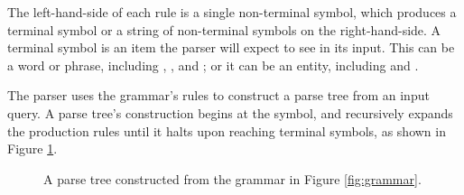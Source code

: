 \documentclass{article}
\begin{document}
The left-hand-side of each rule is a single non-terminal symbol, which produces a terminal symbol or a string of non-terminal symbols on the right-hand-side. A terminal symbol is an item the parser will expect to see in its input. This can be a word or phrase, including , , and ; or it can be an entity, including \texttt{} and \texttt{}.

The parser uses the grammar's rules to construct a parse tree from an input query. A parse tree's construction begins at the  symbol, and recursively expands the production rules until it halts upon reaching terminal symbols, as shown in Figure \ref{fig:parsetree}.

\begin{figure}[H]
\centering
{}
\caption{A parse tree constructed from the grammar in Figure \ref{fig:grammar}.}
\label{fig:parsetree}
\end{figure}
\end{document}
